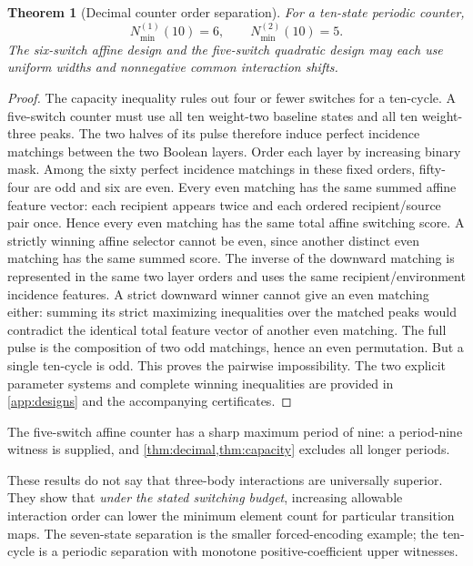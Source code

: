 \documentclass[12pt,letterpaper]{article}
\newtheorem{theorem}{Theorem}[section]
\theoremstyle{definition}\newtheorem{definition}[theorem]{Definition}
\theoremstyle{remark}\newtheorem{remark}[theorem]{Remark}
\newcommand{\Nmin}{N_{\min}}
\begin{document}
\begin{theorem}[Decimal counter order separation]\label{thm:decimal}
For a ten-state periodic counter,
\begin{equation}\label{eq:decimal}
\boxed{\Nmin^{(1)}(10)=6,\qquad \Nmin^{(2)}(10)=5.}
\end{equation}
The six-switch affine design and the five-switch quadratic design may each use uniform widths and nonnegative common interaction shifts.
\end{theorem}
\begin{proof}
The capacity inequality rules out four or fewer switches for a ten-cycle. A five-switch counter must use all ten weight-two baseline states and all ten weight-three peaks. The two halves of its pulse therefore induce perfect incidence matchings between the two Boolean layers. Order each layer by increasing binary mask. Among the sixty perfect incidence matchings in these fixed orders, fifty-four are odd and six are even. Every even matching has the same summed affine feature vector: each recipient appears twice and each ordered recipient/source pair once. Hence every even matching has the same total affine switching score. A strictly winning affine selector cannot be even, since another distinct even matching has the same summed score. The inverse of the downward matching is represented in the same two layer orders and uses the same recipient/environment incidence features. A strict downward winner cannot give an even matching either: summing its strict maximizing inequalities over the matched peaks would contradict the identical total feature vector of another even matching. The full pulse is the composition of two odd matchings, hence an even permutation. But a single ten-cycle is odd. This proves the pairwise impossibility. The two explicit parameter systems and complete winning inequalities are provided in \cref{app:designs} and the accompanying certificates.
\end{proof}

The five-switch affine counter has a sharp maximum period of nine: a period-nine witness is supplied, and \cref{thm:decimal,thm:capacity} excludes all longer periods.

These results do not say that three-body interactions are universally superior. They show that \emph{under the stated switching budget}, increasing allowable interaction order can lower the minimum element count for particular transition maps. The seven-state separation is the smaller forced-encoding example; the ten-cycle is a periodic separation with monotone positive-coefficient upper witnesses.
\end{document}
